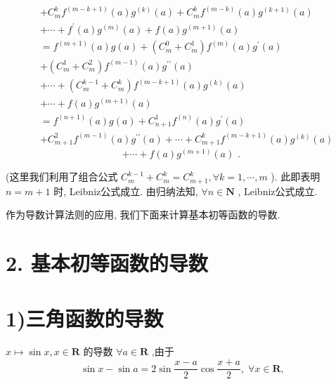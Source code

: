 \begin{align*}
	&+ {C}_{m}^{k}{f}^{\left( m - k + 1\right) }\left( a\right) {g}^{\left( k\right) }\left( a\right)  + {C}_{m}^{k}{f}^{\left( m - k\right) }\left( a\right) {g}^{\left( k + 1\right) }\left( a\right)\\
	&+ \cdots  + {f}^{\prime }\left( a\right) {g}^{\left( m\right) }\left( a\right)  + f\left( a\right) {g}^{\left( m + 1\right) }\left( a\right)\\
	&= {f}^{\left( m + 1\right) }\left( a\right) g\left( a\right)  + \left( {{C}_{m}^{0} + {C}_{m}^{1}}\right) {f}^{\left( m\right) }\left( a\right) {g}^{\prime }\left( a\right)\\
	&+ \left( {{C}_{m}^{1} + {C}_{m}^{2}}\right) {f}^{\left( m - 1\right) }\left( a\right) {g}^{\prime \prime }\left( a\right)\\
	&+ \cdots  + \left( {{C}_{m}^{k - 1} + {C}_{m}^{k}}\right) {f}^{\left( m - k + 1\right) }\left( a\right) {g}^{\left( k\right) }\left( a\right)\\
	&+ \cdots  + f\left( a\right) {g}^{\left( m + 1\right) }\left( a\right)\\
	&= {f}^{\left( n + 1\right) }\left( a\right) g\left( a\right)  + {C}_{n + 1}^{1}{f}^{\left( n\right) }\left( a\right) {g}^{\prime }\left( a\right)\\
	&+ {C}_{m + 1}^{2}{f}^{\left( m - 1\right) }\left( a\right) {g}^{\prime \prime }\left( a\right)  + \cdots  + {C}_{m + 1}^{k}{f}^{\left( m - k + 1\right) }\left( a\right) {g}^{\left( k\right) }\left( a\right)
\end{align*}
$$+ \cdots  + f\left( a\right) {g}^{\left( m + 1\right) }\left( a\right) \text{ . }$$

(这里我们利用了组合公式 ${C}_{m}^{k - 1} + {C}_{m}^{k} = {C}_{m + 1}^{k},\forall k = 1,\cdots ,m$ ). 此即表明 $n = m + 1$ 时, Leibniz公式成立. 由归纳法知, $\forall n \in  \mathbf{N}$ , Leibniz公式成立.

作为导数计算法则的应用, 我们下面来计算基本初等函数的导数.

\section*{2. 基本初等函数的导数}

\section*{1)三角函数的导数}

$x \mapsto  \sin x,x \in  \mathbf{R}$ 的导数 $\forall a \in  \mathbf{R}$ ,由于
$$\sin x - \sin a = 2\sin \frac{x - a}{2}\cos \frac{x + a}{2},\;\forall x \in  \mathbf{R},$$

